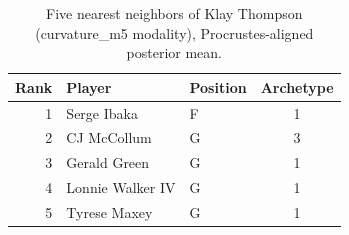 \begin{table}[htbp]
  \centering\small
  \begin{tabular}{rllc}
    \toprule
    Rank & Player & Position & Archetype \\
    \midrule
    1 & Serge Ibaka & F & 1 \\
    2 & CJ McCollum & G & 3 \\
    3 & Gerald Green & G & 1 \\
    4 & Lonnie Walker IV & G & 1 \\
    5 & Tyrese Maxey & G & 1 \\
    \bottomrule
  \end{tabular}
  \caption{Five nearest neighbors of Klay Thompson (curvature_m5 modality), Procrustes-aligned posterior mean.}
  \label{tab:Klay_Thompson_neighbors_curvature_m5}
\end{table}

